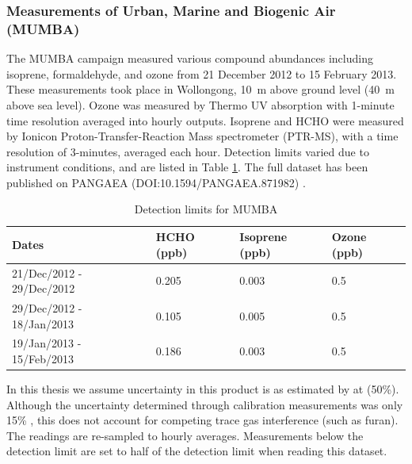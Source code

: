     
    \subsubsection{Measurements of Urban, Marine and Biogenic Air (MUMBA)}
    \label{Model:datasets:MUMBA}
    
      The MUMBA campaign \parencite{PatonWalsh2017} measured various compound abundances including isoprene, formaldehyde, and ozone from 21 December 2012 to 15 February 2013.
      These measurements took place in Wollongong, 10~m above ground level (40~m above sea level).
      Ozone was measured by Thermo UV absorption with 1-minute time resolution averaged into hourly outputs.
      Isoprene and HCHO were measured by Ionicon Proton-Transfer-Reaction Mass spectrometer (PTR-MS), with a time resolution of 3-minutes, averaged each hour.
      Detection limits varied due to instrument conditions, and are listed in Table \ref{Model:datasets:MUMBA:tab_detectionlimits}.
      The full dataset has been published on PANGAEA (DOI:10.1594/PANGAEA.871982) \parencite{Guerette2018}.
      
      
      \begin{table}
        \caption{Detection limits for MUMBA}
        \begin{tabular}{  l |  l  l  l }
          
          \textbf{Dates} & \textbf{HCHO (ppb)} & \textbf{Isoprene (ppb)} & \textbf{Ozone (ppb)}
          \\ \hline
          21/Dec/2012 - 29/Dec/2012 & 0.205 & 0.003 & 0.5 \\
          29/Dec/2012 - 18/Jan/2013 & 0.105 & 0.005 & 0.5 \\
          19/Jan/2013 - 15/Feb/2013 & 0.186 & 0.003 & 0.5 \\
        \end{tabular}
        \label{Model:datasets:MUMBA:tab_detectionlimits}
      \end{table}
      
      In this thesis we assume uncertainty in this product is as estimated by \textcite{Dunne2018} at (50\%).
      Although the uncertainty determined through calibration measurements was only 15\% \parencite{Guerette2018}, this does not account for competing trace gas interference (such as furan).
      The readings are re-sampled to hourly averages.
      Measurements below the detection limit are set to half of the detection limit when reading this dataset.
    
